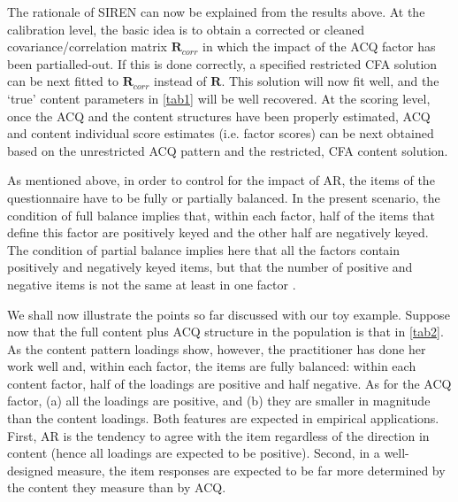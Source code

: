 The rationale of SIREN can now be explained from the results above. At the calibration level, the basic idea is to obtain a corrected or cleaned covariance/correlation matrix $\mathbf{R}_{corr}$ in which the impact of the ACQ factor has been partialled-out. If this is done correctly, a specified restricted CFA solution can be next fitted to $\mathbf{R}_{corr}$  instead of $\mathbf{R}$. This solution will now fit well, and the ‘true’ content parameters in \cref{tab1} will be well recovered.
At the scoring level, once the ACQ and the content structures have been properly estimated, ACQ and content individual score estimates (i.e. factor scores) can be next obtained based on the unrestricted ACQ pattern and the restricted, CFA content solution.

As mentioned above, in order to control for the impact of AR, the items of the questionnaire have to be fully or partially balanced. In the present scenario, the condition of full balance implies that, within each factor, half of the items that define this factor are positively keyed and the other half are negatively keyed. The condition of partial balance implies here that all the factors contain positively and negatively keyed items, but that the number of positive and negative items is not the same at least in one factor \citep[e.g.][]{Lorenzo-Seva:2009}.

We shall now illustrate the points so far discussed with our toy example. Suppose now that the full content plus ACQ structure in the population is that in \cref{tab2}. As the content pattern loadings show, however, the practitioner has done her work well and, within each factor, the items are fully balanced:  within each content factor, half of the loadings are positive and half negative. As for the ACQ factor, (a) all the loadings are positive, and (b) they are smaller in magnitude than the content loadings. Both features are expected in empirical applications. First, AR is the tendency to agree with the item regardless of the direction in content (hence all loadings are expected to be positive). Second, in a well-designed measure, the item responses are expected to be far more determined by the content they measure than by ACQ.

